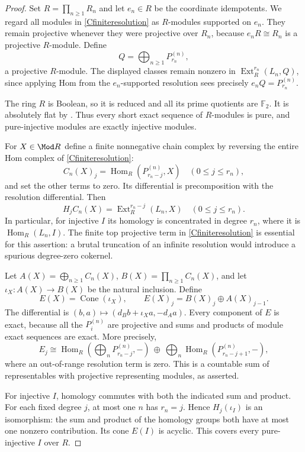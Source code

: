 \begin{proof}
Set $R=\prod_{n\geq1}R_n$ and let $e_n\in R$ be the coordinate idempotents. We regard all modules in \eqref{Cfiniteresolution} as $R$-modules supported on $e_n$. They remain projective whenever they were projective over $R_n$, because $e_nR\cong R_n$ is a projective $R$-module. Define
\[
 Q=\bigoplus_{n\geq1}P^{(n)}_{r_n},
\]
a projective $R$-module. The displayed classes remain nonzero in $\operatorname{Ext}^{r_n}_R(L_n,Q)$, since applying Hom from the $e_n$-supported resolution sees precisely $e_nQ=P^{(n)}_{r_n}$.

The ring $R$ is Boolean, so it is reduced and all its prime quotients are $\mathbb F_2$. It is absolutely flat by \citet[Lemma 15.106.5, tag 092F]{StacksAbsolutelyFlatC}. Thus every short exact sequence of $R$-modules is pure, and pure-injective modules are exactly injective modules.

For $X\in\Mod R$ define a finite nonnegative chain complex by reversing the entire Hom complex of \eqref{Cfiniteresolution}:
\[
 C_n(X)_j=\operatorname{Hom}_R(P^{(n)}_{r_n-j},X)
 \quad(0\leq j\leq r_n),
\]
and set the other terms to zero. Its differential is precomposition with the resolution differential. Then
\[
 H_jC_n(X)=\operatorname{Ext}^{r_n-j}_R(L_n,X)
 \quad(0\leq j\leq r_n).
\]
In particular, for injective $I$ its homology is concentrated in degree $r_n$, where it is $\operatorname{Hom}_R(L_n,I)$. The finite top projective term in \eqref{Cfiniteresolution} is essential for this assertion: a brutal truncation of an infinite resolution would introduce a spurious degree-zero cokernel.

Let $A(X)=\bigoplus_{n\geq1}C_n(X)$, $B(X)=\prod_{n\geq1}C_n(X)$, and let $\iota_X:A(X)\to B(X)$ be the natural inclusion. Define
\[
 E(X)=\operatorname{Cone}(\iota_X),\qquad
 E(X)_j=B(X)_j\oplus A(X)_{j-1}.
\]
The differential is $(b,a)\mapsto(d_Bb+\iota_Xa,-d_Aa)$. Every component of $E$ is exact, because all the $P^{(n)}_i$ are projective and sums and products of module exact sequences are exact. More precisely,
\[
 E_j\cong
 \operatorname{Hom}_R\!\left(\bigoplus_nP^{(n)}_{r_n-j},-\right)
 \ \oplus\ \bigoplus_n
 \operatorname{Hom}_R(P^{(n)}_{r_n-j+1},-),
\]
where an out-of-range resolution term is zero. This is a countable sum of representables with projective representing modules, as asserted.

For injective $I$, homology commutes with both the indicated sum and product. For each fixed degree $j$, at most one $n$ has $r_n=j$. Hence $H_j(\iota_I)$ is an isomorphism: the sum and product of the homology groups both have at most one nonzero contribution. Its cone $E(I)$ is acyclic. This covers every pure-injective $I$ over $R$.


\end{proof}
